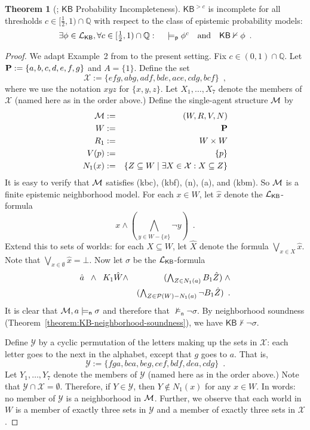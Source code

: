 \documentclass[12pt]{article}
\theoremstyle{definition}
\newtheorem{theorem}{Theorem}[section]
\newcommand{\Rat}{\mathbb{Q}}  %
\newcommand{\pow}{{\cal P}}    %
\newcommand{\M}{{\cal M}}      %
\newcommand{\Prop}{{\bf P}}    %
\newcommand{\Lang}{{\cal L}}   %
\newcommand{\KB}{{\mathsf{KB}}}                        %
\newcommand{\KBc}{{\mathsf{KB}^{\mathsf{>}c}}}         %
\newcommand{\modelsn}{\models_{\mathsf{n}}}                  %
\newcommand{\modelsp}{\models_{\mathsf{p}}}                  %
\begin{document}
\begin{theorem}[\cite{WalleyFine1979:vomacp}; $\KB$ Probability Incompleteness]
  \label{theorem:KB-probability-incompleteness}
  $\KBc$ is incomplete for all thresholds $c\in[\frac 12,1)\cap\Rat$ with respect to the class of epistemic
  probability models:
  \[
  \textstyle 
  \exists\phi\in\Lang_\KB,
  \forall c\in[\frac 12,1)
  \cap\Rat:\quad
  {}\modelsp\phi^c
  \quad\text{and}\quad
  \KB\nvdash\phi\enspace.
  \]
\end{theorem}
\begin{proof}
  We adapt Example~2 from \cite[pp.~344-345]{WalleyFine1979:vomacp} to the present setting.
  Fix $c\in(0,1)\cap\Rat$.
  Let $\Prop:=\{a,b,c,d,e,f,g\}$ and $A=\{1\}$.  Define the set
  \[
  \mathcal{X}:=\{efg, abg, adf, bde, ace, cdg, bcf\}\enspace,
  \]
  where we use the notation $xyz$ for $\{x,y,z\}$.  
  Let $X_1,\dots,X_7$ denote the members of $\mathcal{X}$ (named here as in the order above.)
  Define the single-agent structure $\M$ by
  \begin{eqnarray*}
    \M &:=& (W,R,V,N) \\
    W &:=& \Prop \\
    R_1 &:=& W\times W \\
    V(p) &:=& \{p\} \\
    N_1(x) &:=& \{Z\subseteq W\mid \exists X\in\mathcal{X}: X\subseteq Z\}
  \end{eqnarray*}
  It is easy to verify that $\M$ satisfies (kbc), (kbf), (n), (a), and (kbm).  So
  $\M$ is a finite epistemic neighborhood model.
  For each $x\in W$, let $\hat x$ denote the $\Lang_\KB$-formula
  \[
  \textstyle
  x \land (\bigwedge_{y\in W-\{x\}}\lnot y) \enspace.
  \]
  Extend this to sets of worlds: for each $X\subseteq W$, let $\hat X$ denote
  the formula $\textstyle\bigvee_{x\in X}\hat x$. Note that
  $\textstyle\bigvee_{x\in\emptyset}\hat x=\bot$.
  Now let $\sigma$ be the $\Lang_\KB$-formula
  \begin{eqnarray*}
    \hat a \;\;\land\;\; K_1\hat W &\land&
    \textstyle
    (\bigwedge_{Z\in N_1(a)} B_1\hat Z)
    \;\land 
    \\
    &&
    \textstyle
    (\bigwedge_{Z\in\pow(W)-N_1(a)}\lnot B_1\hat Z) \enspace.
  \end{eqnarray*}
  It is clear that $\M,a\modelsn\sigma$ and therefore that
  $\not\modelsn\lnot\sigma$.  By neighborhood soundness
  (Theorem~\ref{theorem:KB-neighborhood-soundness}), we have
  $\KB\nvdash\lnot\sigma$.

  Define $\mathcal{Y}$ by a cyclic permutation of the letters
  making up the sets in $\mathcal{X}$:  each letter goes
  to the next in the alphabet, except that $g$ goes to $a$.  That is,
  \[
  \mathcal{Y}:=\{fga, bca, beg, cef, bdf, dea, cdg\}\enspace.
  \]
  Let $Y_1,\dots,Y_7$ denote the members of $\mathcal{Y}$ (named here as in the order above.)
  Note that $\mathcal{Y}\cap\mathcal{X}=\emptyset$.  Therefore,
  if $Y\in\mathcal{Y}$, then $Y\notin N_1(x)$ for any $x\in W$.
  In words: no member of $\mathcal{Y}$ is a neighborhood in $\M$.
  Further, we observe that each world in $W$ is a member of exactly three
  sets in $\mathcal{Y}$ and a member of exactly three sets in $\mathcal{X}$.


\end{proof}
\end{document}
